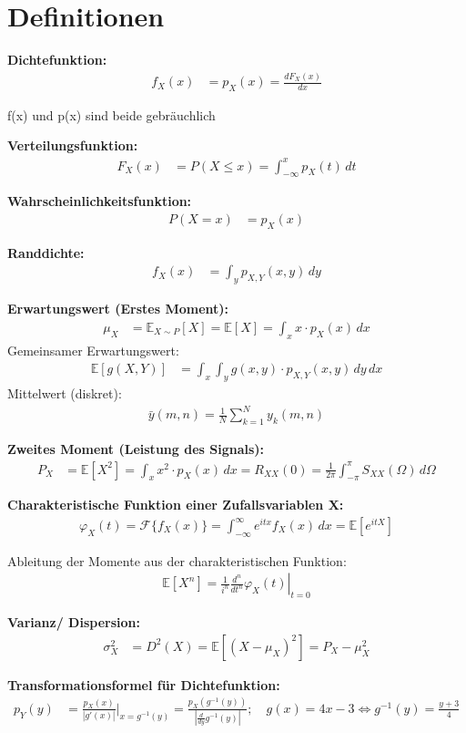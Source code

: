 \section{Definitionen}

\textbf{Dichtefunktion:}
\begin{align}
f_X(x) &= p_X(x) = \frac{dF_X(x)}{dx}
\end{align}

f(x) und p(x) sind beide gebräuchlich

\textbf{Verteilungsfunktion:}
\begin{align}
F_X(x) &= P(X \leq x) = \int_{-\infty}^{x} p_X(t) \, dt
\end{align}

\textbf{Wahrscheinlichkeitsfunktion:}
\begin{align}
P(X = x) &= p_X(x)
\end{align}

\textbf{Randdichte:}
\begin{align}
f_X(x) &= \int_{y} p_{X,Y}(x,y) \, dy
\end{align}

\textbf{Erwartungswert (Erstes Moment):}
\begin{align}
\mu_X &= \mathbb{E}_{X \sim P}[X] = \mathbb{E}[X] = \int_{x} x \cdot p_X(x) \, dx
\end{align}
Gemeinsamer Erwartungswert:
\begin{align}
\mathbb{E}[g(X,Y)] &= \int_{x}\int_{y} g(x,y) \cdot p_{X,Y}(x,y) \, dy \, dx
\end{align}
Mittelwert (diskret):
\begin{align}
\bar{y}(m,n) = \frac{1}{N}\sum_{k=1}^{N}y_k(m,n)
\end{align}

\textbf{Zweites Moment (Leistung des Signals):}
\begin{align}
P_X &= \mathbb{E}[X^2] = \int_{x} x^2 \cdot p_X(x) \, dx = R_{XX}(0) = \frac{1}{2\pi} \int_{-\pi}^{\pi} S_{XX}(\Omega) \, d\Omega
\end{align}

\textbf{Charakteristische Funktion einer Zufallsvariablen X:}
\begin{align}
\varphi_X(t) = \mathcal{F}\{f_X(x)\} = \int_{-\infty}^{\infty} e^{itx} f_X(x) \, dx =\mathbb{E}[e^{itX}]
\end{align}

Ableitung der Momente aus der charakteristischen Funktion:
\begin{align}
\mathbb{E}[X^n] = \frac{1}{i^n} \left. \frac{d^n}{dt^n} \varphi_X(t) \right|_{t=0}
\end{align}

\textbf{Varianz/ Dispersion:}
\begin{align}
\sigma_X^2 &= D^2(X) = \mathbb{E}[(X-\mu_X)^2] = P_X - \mu_X^2
\end{align}

\textbf{Transformationsformel für Dichtefunktion:}
\begin{align}
p_Y(y) &= \frac{p_X(x)}{|g'(x)|} |_{x=g^{-1}(y)} = \frac{p_X(g^{-1}(y))}{ \left|\frac{d}{dy}g^{-1}(y)\right|}; \quad g(x) = 4x-3 \Leftrightarrow
g^{-1}(y) = \frac{y+3}{4} 
\end{align}
